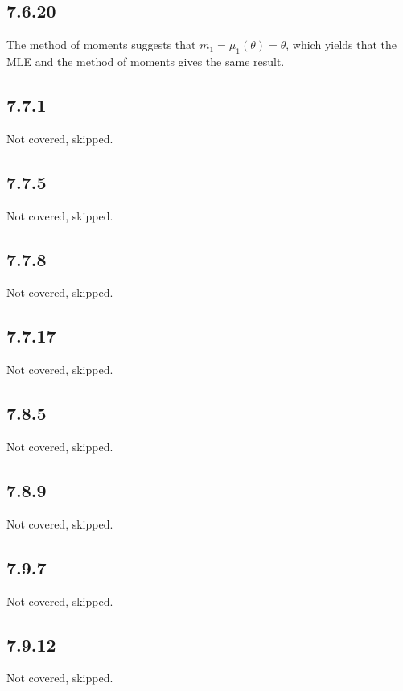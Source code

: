 \documentclass[12pt,letterpaper]{article}
\theoremstyle{definition}
\begin{document}
\subsection*{7.6.20}

The method of moments suggests that $m_1 = \mu_1(\theta) = \theta$, which yields
that the MLE and the method of moments gives the same result.

\subsection*{7.7.1}

Not covered, skipped.

\subsection*{7.7.5}

Not covered, skipped.

\subsection*{7.7.8}

Not covered, skipped.

\subsection*{7.7.17}

Not covered, skipped.

\subsection*{7.8.5}

Not covered, skipped.

\subsection*{7.8.9}

Not covered, skipped.

\subsection*{7.9.7}

Not covered, skipped.

\subsection*{7.9.12}

Not covered, skipped.
\end{document}
